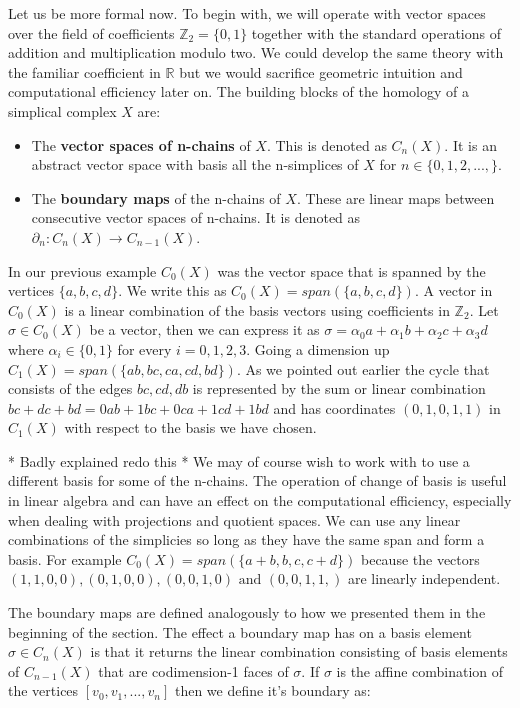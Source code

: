 Let us be more formal now. To begin with, we will operate with vector spaces over the field of coefficients $\mathbb{Z}_2 = \{0, 1\}$ together with the standard operations of addition and multiplication modulo two. We could develop the same theory with the familiar coefficient in $\mathbb{R}$ but we would sacrifice geometric intuition and computational efficiency later on. The building blocks of the homology of a simplical complex $X$ are:


\begin{itemize}
    \item The \textbf{vector spaces of n-chains} of $X$. This is denoted as $C_n(X)$. It is an abstract vector space with basis all the n-simplices of $X$ for $n \in \{0, 1, 2, ..., \}$.
    \item The \textbf{boundary maps} of the n-chains of $X$. These are linear maps between consecutive vector spaces of n-chains. It is denoted as $\partial_n : C_n(X) \to C_{n-1}(X)$.
\end{itemize}

In our previous example $C_0(X)$ was the vector space that is spanned by the vertices $\{a, b, c, d\}$. We write this as $C_0(X) = span(\{a, b, c, d\})$. A vector in $C_0(X)$ is a linear combination of the basis vectors using coefficients in $\mathbb{Z}_2$. Let $\sigma \in C_0(X)$ be a vector, then we can express it as $\sigma  = \alpha_0a + \alpha_1b + \alpha_2c + \alpha_3d$ where $\alpha_i \in \{0 ,1\}$ for every $i = 0, 1, 2, 3$. Going a dimension up $C_1(X) = span(\{ab, bc, ca, cd, bd\})$. As we pointed out earlier the cycle that consists of the edges $bc, cd, db$ is represented by the sum or linear combination $bc + dc + bd = 0ab + 1bc + 0ca + 1cd + 1bd$ and has coordinates $(0, 1, 0, 1, 1)$ in $C_1(X)$ with respect to the basis we have chosen.

* Badly explained redo this *
We may of course wish to work with to use a different basis for some of the n-chains. The operation of change of basis is useful in linear algebra and can have an effect on the computational efficiency, especially when dealing with projections and quotient spaces. We can use any linear combinations of the simplicies so long as they have the same span and form a basis. For example $C_0(X) = span(\{a + b, b, c, c + d\})$ because the vectors $(1, 1, 0, 0), (0, 1, 0, 0), (0, 0, 1, 0) \text { and } (0, 0, 1, 1,)$ are linearly independent.

The boundary maps are defined analogously to how we presented them in the beginning of the section. The effect a boundary map has on a basis element $\sigma \in C_n(X)$ is that it returns the linear combination consisting of basis elements of $C_{n-1}(X)$ that are codimension-1 faces of $\sigma$. If $\sigma$ is the affine combination of the vertices $[v_0, v_1, ..., v_n]$ then we define it's boundary as:

